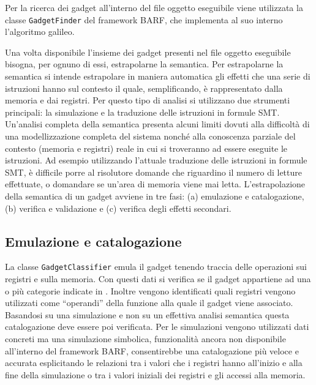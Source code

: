 \begin{inparaenum}[1)]
Per la ricerca dei gadget all'interno del file oggetto eseguibile
viene utilizzata la classe \lstinline{GadgetFinder} del framework
BARF, che implementa al suo interno l'algoritmo galileo\cite{roemer-12}. 


Una volta disponibile l'insieme dei gadget presenti nel file oggetto
eseguibile bisogna, per ognuno di essi, estrapolarne la semantica. Per
estrapolarne la semantica si intende estrapolare in maniera automatica
gli effetti che una serie di istruzioni hanno sul contesto il quale,
semplificando, è rappresentato dalla memoria e dai registri. Per
questo tipo di analisi si utilizzano due strumenti principali: la
simulazione e la traduzione delle istruzioni in formule
SMT. Un'analisi completa della semantica presenta alcuni limiti dovuti
alla difficoltà di una modellizzazione completa del sistema nonché
alla conoscenza parziale del contesto (memoria e registri) reale in
cui si troveranno ad essere eseguite le istruzioni. Ad esempio
utilizzando l'attuale traduzione delle istruzioni in formule SMT, è
difficile porre al risolutore domande che riguardino il numero di
letture effettuate, o domandare se un'area di memoria viene mai
letta. L'estrapolazione della semantica di un gadget avviene in tre
fasi: (a) emulazione e catalogazione, (b) verifica e validazione e
(c) verifica degli effetti secondari.

\subsection{Emulazione e catalogazione}
La classe \lstinline{GadgetClassifier} emula il gadget tenendo traccia
delle operazioni sui registri e sulla memoria. Con questi dati si
verifica se il gadget appartiene ad una o più categorie indicate in
\cite{schwartz-2011}. 
Inoltre vengono identificati quali registri vengono utilizzati come
``operandi'' della funzione alla quale il gadget viene
associato. Basandosi su una simulazione e non su un effettiva analisi
semantica questa catalogazione deve essere poi verificata. Per le
simulazioni vengono utilizzati dati concreti ma una simulazione
simbolica, funzionalità ancora non disponibile all'interno del
framework BARF, consentirebbe una catalogazione più veloce e
accurata esplicitando le relazioni tra i valori che i registri hanno
all'inizio e alla fine della simulazione o tra i valori iniziali dei
registri e gli accessi alla memoria.


\end{inparaenum}
